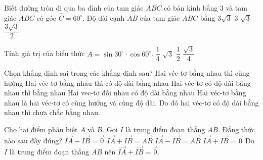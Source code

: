 \begin{ex}%
Biết đường tròn đi qua ba đỉnh của tam giác $A B C$ có bán kính bằng $3$ và tam giác $A B C$ có góc $\widehat{C}=60^{\circ}$. Độ dài cạnh $A B$ của tam giác $A B C$ bằng
\choice
{\True $3 \sqrt{3}$}
{$3$}
{$\sqrt{3}$}
{$\dfrac{3 \sqrt{3}}{2}$}
\end{ex}

\begin{ex}%
Tính giá trị của biểu thức $A=\sin 30^\circ \cdot \cos 60^\circ$.
\choice
{\True $\dfrac{1}{4}$}
{$\sqrt{3}$}
{$\dfrac{1}{2}$}
{$\dfrac{\sqrt{3}}{4}$}
\end{ex}

\begin{ex}%
Chọn khẳng định sai trong các khẳng định sau?
\choice
{ Hai véc-tơ bằng nhau thì cùng hướng}
{Hai véc-tơ bằng nhau thì có độ dài bằng nhau}
{\True Hai véc-tơ có độ dài bằng nhau thì bằng nhau}
{Hai vec-tơ đối nhau có độ dài bằng nhau}
\loigiai
{ Hai véc-tơ bằng nhau là hai véc-tơ có cùng hướng và cùng độ dài. Do đó hai véc-tơ có độ dài bằng nhau thì chưa chắc bằng nhau.}
\end{ex}

\begin{ex}%
Cho hai điểm phân biệt $A$ và $B$. Gọi $I$ là trung điểm đoạn thẳng $AB$. Đẳng thức nào sau đây đúng?
\choice
{$\overrightarrow{IA}-\overrightarrow{IB}=\overrightarrow{0}$}
{$\overrightarrow{IA}+\overrightarrow{IB}=\overrightarrow{AB}$}
{$\overrightarrow{IA}-\overrightarrow{IB}=\overrightarrow{AB}$}
{\True $\overrightarrow{IA}+\overrightarrow{IB}=\overrightarrow{0}$}
\loigiai
{
Do  $I$ là trung điểm đoạn thẳng $AB$ nên $\overrightarrow{IA}+\overrightarrow{IB}=\overrightarrow{0}$.
}
\end{ex}


